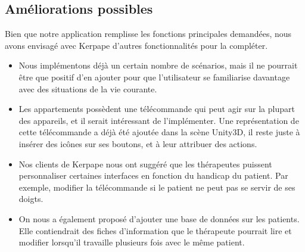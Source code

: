 \subsection{Améliorations possibles}

Bien que notre application remplisse les fonctions principales demandées, nous avons envisagé avec Kerpape d'autres fonctionnalités pour la compléter.
\begin{itemize}
\item Nous implémentons déjà un certain nombre de scénarios, mais il ne pourrait être que positif d'en ajouter pour que l'utilisateur se familiarise davantage avec des situations de la vie courante.
\item Les appartements possèdent une télécommande qui peut agir sur la plupart des appareils, et il serait intéressant de l'implémenter. Une représentation de cette télécommande a déjà été ajoutée dans la scène Unity3D, il reste juste à insérer des icônes sur ses boutons, et à leur attribuer des actions.
\item Nos clients de Kerpape nous ont suggéré que les thérapeutes puissent personnaliser certaines interfaces en fonction du handicap du patient. Par exemple, modifier la télécommande si le patient ne peut pas se servir de ses doigts.
\item On nous a également proposé d'ajouter une base de données sur les patients. Elle contiendrait des fiches d'information que le thérapeute pourrait lire et modifier lorsqu'il travaille plusieurs fois avec le même patient.
\end{itemize}
